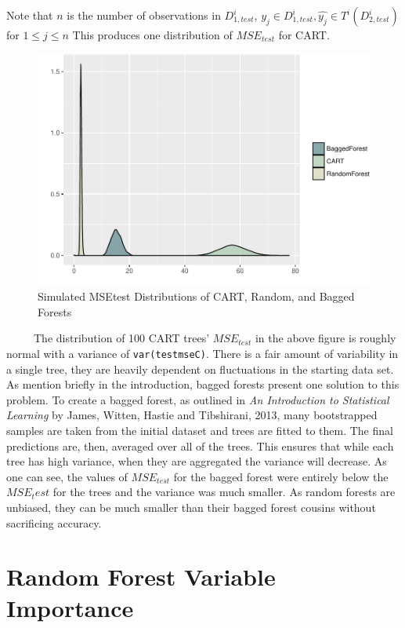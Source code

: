 \documentclass[12pt,twoside]{reedthesis}
\begin{document}
  Note that \(n\) is the number of observations in \(D_{1, test}^i\),
  \(y_j \in D_{1, test}^i, \hat{y_j} \in T^i(D_{2, test}^i)\) for
  \(1 \leq j \leq n\) This produces one distribution of \(MSE_{test}\) for
  CART.
  
  \begin{figure}[htbp]
  \centering
  \includegraphics{Thesis_files/figure-latex/baggedvcartvforest-1.pdf}
  \caption{\label{fig:baggedvcartvforest}Simulated MSEtest Distributions of
  CART, Random, and Bagged Forests}
  \end{figure}
  
  ~~~~~The distribution of 100 CART trees' \(MSE_{test}\) in the above
  figure is roughly normal with a variance of \texttt{var(testmseC)}.
  There is a fair amount of variability in a single tree, they are heavily
  dependent on fluctuations in the starting data set. As mention briefly
  in the introduction, bagged forests present one solution to this
  problem. To create a bagged forest, as outlined in \emph{An Introduction
  to Statistical Learning} by James, Witten, Hastie and Tibshirani, 2013,
  many bootstrapped samples are taken from the initial dataset and trees
  are fitted to them. The final predictions are, then, averaged over all
  of the trees. This ensures that while each tree has high variance, when
  they are aggregated the variance will decrease. As one can see, the
  values of \(MSE_{test}\) for the bagged forest were entirely below the
  \(MSE_test\) for the trees and the variance was much smaller. As random
  forests are unbiased, they can be much smaller than their bagged forest
  cousins without sacrificing accuracy.
  
  \chapter{Random Forest Variable
  Importance}\label{random-forest-variable-importance}
  
\end{document}
